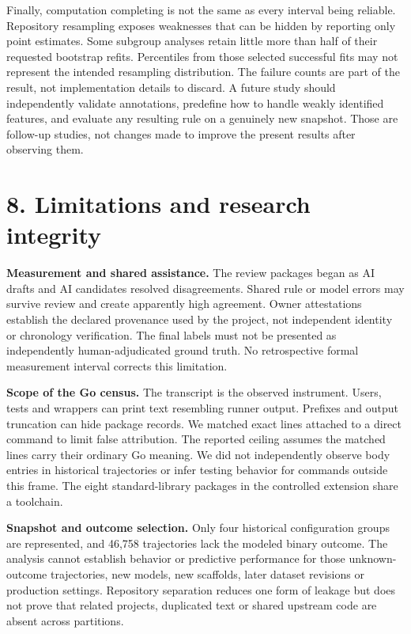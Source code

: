 \documentclass[10pt,a4paper]{article}
\begin{document}
Finally, computation completing is not the same as every interval being reliable. Repository resampling exposes weaknesses that can be hidden by reporting only point estimates. Some subgroup analyses retain little more than half of their requested bootstrap refits. Percentiles from those selected successful fits may not represent the intended resampling distribution. The failure counts are part of the result, not implementation details to discard. A future study should independently validate annotations, predefine how to handle weakly identified features, and evaluate any resulting rule on a genuinely new snapshot. Those are follow-up studies, not changes made to improve the present results after observing them.

\section{8. Limitations and research integrity}
\textbf{Measurement and shared assistance.} The review packages began as AI drafts and AI candidates resolved disagreements. Shared rule or model errors may survive review and create apparently high agreement. Owner attestations establish the declared provenance used by the project, not independent identity or chronology verification. The final labels must not be presented as independently human-adjudicated ground truth. No retrospective formal measurement interval corrects this limitation.

\textbf{Scope of the Go census.} The transcript is the observed instrument. Users, tests and wrappers can print text resembling runner output. Prefixes and output truncation can hide package records. We matched exact lines attached to a direct command to limit false attribution. The reported ceiling assumes the matched lines carry their ordinary Go meaning. We did not independently observe body entries in historical trajectories or infer testing behavior for commands outside this frame. The eight standard-library packages in the controlled extension share a toolchain.

\textbf{Snapshot and outcome selection.} Only four historical configuration groups are represented, and 46,758 trajectories lack the modeled binary outcome. The analysis cannot establish behavior or predictive performance for those unknown-outcome trajectories, new models, new scaffolds, later dataset revisions or production settings. Repository separation reduces one form of leakage but does not prove that related projects, duplicated text or shared upstream code are absent across partitions.
\end{document}
